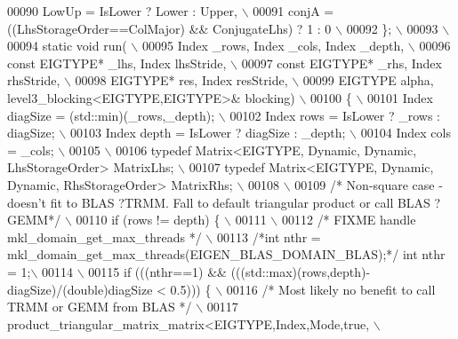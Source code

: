 \begin{DoxyCode}
00090 \textcolor{preprocessor}{    LowUp = IsLower ? Lower : Upper, \(\backslash\)}
00091 \textcolor{preprocessor}{    conjA = ((LhsStorageOrder==ColMajor) && ConjugateLhs) ? 1 : 0 \(\backslash\)}
00092 \textcolor{preprocessor}{  \}; \(\backslash\)}
00093 \textcolor{preprocessor}{\(\backslash\)}
00094 \textcolor{preprocessor}{  static void run( \(\backslash\)}
00095 \textcolor{preprocessor}{    Index \_rows, Index \_cols, Index \_depth, \(\backslash\)}
00096 \textcolor{preprocessor}{    const EIGTYPE* \_lhs, Index lhsStride, \(\backslash\)}
00097 \textcolor{preprocessor}{    const EIGTYPE* \_rhs, Index rhsStride, \(\backslash\)}
00098 \textcolor{preprocessor}{    EIGTYPE* res,        Index resStride, \(\backslash\)}
00099 \textcolor{preprocessor}{    EIGTYPE alpha, level3\_blocking<EIGTYPE,EIGTYPE>& blocking) \(\backslash\)}
00100 \textcolor{preprocessor}{  \{ \(\backslash\)}
00101 \textcolor{preprocessor}{   Index diagSize  = (std::min)(\_rows,\_depth); \(\backslash\)}
00102 \textcolor{preprocessor}{   Index rows      = IsLower ? \_rows : diagSize; \(\backslash\)}
00103 \textcolor{preprocessor}{   Index depth     = IsLower ? diagSize : \_depth; \(\backslash\)}
00104 \textcolor{preprocessor}{   Index cols      = \_cols; \(\backslash\)}
00105 \textcolor{preprocessor}{\(\backslash\)}
00106 \textcolor{preprocessor}{   typedef Matrix<EIGTYPE, Dynamic, Dynamic, LhsStorageOrder> MatrixLhs; \(\backslash\)}
00107 \textcolor{preprocessor}{   typedef Matrix<EIGTYPE, Dynamic, Dynamic, RhsStorageOrder> MatrixRhs; \(\backslash\)}
00108 \textcolor{preprocessor}{\(\backslash\)}
00109 \textcolor{preprocessor}{}\textcolor{comment}{/* Non-square case - doesn't fit to BLAS ?TRMM. Fall to default triangular product or call BLAS ?GEMM*/}\textcolor{preprocessor}{ \(\backslash\)}
00110 \textcolor{preprocessor}{   if (rows != depth) \{ \(\backslash\)}
00111 \textcolor{preprocessor}{\(\backslash\)}
00112 \textcolor{preprocessor}{     }\textcolor{comment}{/* FIXME handle mkl\_domain\_get\_max\_threads */}\textcolor{preprocessor}{ \(\backslash\)}
00113 \textcolor{preprocessor}{     }\textcolor{comment}{/*int nthr = mkl\_domain\_get\_max\_threads(EIGEN\_BLAS\_DOMAIN\_BLAS);*/}\textcolor{preprocessor}{ int nthr = 1;\(\backslash\)}
00114 \textcolor{preprocessor}{\(\backslash\)}
00115 \textcolor{preprocessor}{     if (((nthr==1) && (((std::max)(rows,depth)-diagSize)/(double)diagSize < 0.5))) \{ \(\backslash\)}
00116 \textcolor{preprocessor}{     }\textcolor{comment}{/* Most likely no benefit to call TRMM or GEMM from BLAS */}\textcolor{preprocessor}{ \(\backslash\)}
00117 \textcolor{preprocessor}{       product\_triangular\_matrix\_matrix<EIGTYPE,Index,Mode,true, \(\backslash\)}

\end{DoxyCode}
